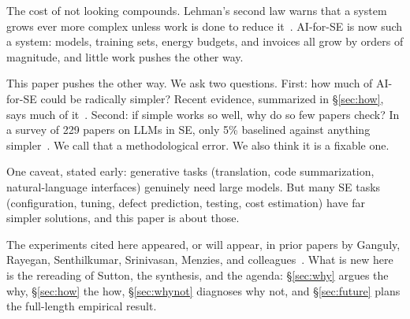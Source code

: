 \documentclass[10pt,conference]{IEEEtran}
\begin{document}
The cost of not looking compounds. Lehman's second law warns that a
system grows ever more complex unless work is done to reduce
it~\cite{lehman80}. AI-for-SE is now such a system: models, training
sets, energy budgets, and invoices all grow by orders of magnitude,
and little work pushes the other way.

This paper pushes the other way. We ask two questions. First: how
much of AI-for-SE could be radically simpler? Recent evidence,
summarized in \S\ref{sec:how}, says much of it~\cite{ganguly26}.
Second: if simple works so well, why do so few papers check? In a
survey of 229 papers on LLMs in SE, only 5\% baselined against
anything simpler~\cite{menzies26}. We call that a methodological
error. We also think it is a fixable one.

One caveat, stated early: generative tasks (translation, code
summarization, natural-language interfaces) genuinely need large
models. But many SE tasks (configuration, tuning, defect prediction,
testing, cost estimation) have far simpler solutions, and this paper
is about those.

The experiments cited here appeared, or will appear, in prior papers
by Ganguly, Rayegan, Senthilkumar, Srinivasan, Menzies, and
colleagues~\cite{ganguly26, rayegan26, senthilkumar26, srinivasan26,
menzies26}. What is new here is the rereading of Sutton, the
synthesis, and the agenda: \S\ref{sec:why} argues the why,
\S\ref{sec:how} the how, \S\ref{sec:whynot} diagnoses why not, and
\S\ref{sec:future} plans the full-length empirical result.
\end{document}
